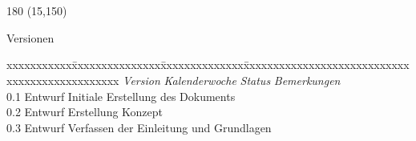 \chapter*{}
\label{chap:versionen}

\begin{textblock}{180} (15,150)
\color{black}
\begin{huge}
Versionen
\end{huge}
\vspace{10mm}

\fontsize{10pt}{18pt}\selectfont
\begin{tabbing}
xxxxxxxxxxx\=xxxxxxxxxxxxxxx\=xxxxxxxxxxxxxx\=xxxxxxxxxxxxxxxxxxxxxxxxxxxxxxxxxxxxxxxxxxxxxxx \kill
\textit{Version}	\> \textit{Kalenderwoche}	\> \textit{Status}		\> \textit{Bemerkungen}\\
0.1		\> Entwurf		\> Initiale Erstellung des Dokuments\\
0.2		\> Entwurf		\> Erstellung Konzept\\
0.3		\> Entwurf		\> Verfassen der Einleitung und Grundlagen\\
\end{tabbing}

\end{textblock}

